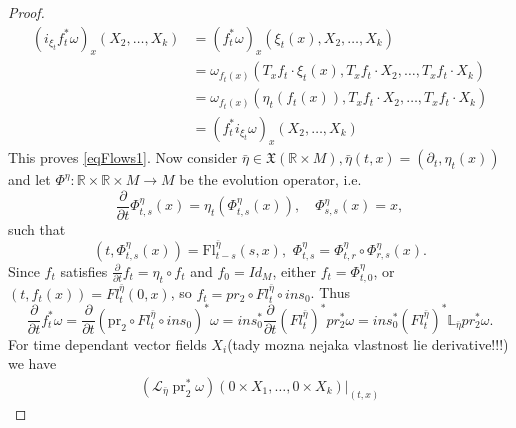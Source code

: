 \documentclass{article}
\theoremstyle{definition}
\begin{document}
\begin{proof}
    \begin{equation*}
        \begin{split}
           \left(i_{\xi_t} f_t^* \omega\right)_x\left(X_2, \ldots, X_k\right) &= \left(f_t^* \omega\right)_x\left(\xi_t(x), X_2, \ldots, X_k\right)\\
            &=\omega_{f_t(x)}\left(T_x f_t \cdot \xi_t(x), T_x f_t \cdot X_2, \ldots, T_x f_t \cdot X_k\right) \\
            &=\omega_{f_t(x)}\left(\eta_t\left(f_t(x)\right), T_x f_t \cdot X_2, \ldots, T_x f_t \cdot X_k\right) \\
            &= \left(f_t^* i_{\xi_t}  \omega\right)_x\left(X_2, \ldots, X_k\right)
        \end{split}
    \end{equation*}
    This proves \eqref{eqFlows1}. Now consider $\bar{\eta} \in \mathfrak{X}(\mathbb{R} \times M), \bar{\eta}(t, x)=\left(\partial_t, \eta_t(x)\right)$ and let $\Phi^\eta : \mathbb{R} \times \mathbb{R} \times M \rightarrow M$ be the evolution operator, i.e.
    \begin{equation*}
        \frac{\partial}{\partial t} \Phi_{t, s}^\eta(x)=\eta_t\left(\Phi_{t, s}^\eta(x)\right), \quad \Phi_{s, s}^\eta(x) = x,
    \end{equation*}
    such that 
    \begin{equation*}
        \left(t, \Phi_{t, s}^\eta(x)\right)=\mathrm{Fl}_{t-s}^{\bar{\eta}}(s, x), \hspace{4pt} \Phi_{t, s}^\eta=\Phi_{t, r}^\eta \circ \Phi_{r, s}^\eta(x).
    \end{equation*}
    Since $f_t$ satisfies 
    $\frac{\partial}{\partial t} f_t = \eta_t \circ f_t$ and $ f_0 = Id_M$, either $f_t = \Phi^\eta_{t,0}$, or $(t,f_t(x)) = Fl^{\bar{\eta}}_t(0,x)$, so $f_t = pr_2 \circ Fl^{\bar{\eta}}_t \circ ins_0$. Thus
    \begin{equation*}
        \frac{\partial}{\partial t} f_t^* \omega=\frac{\partial}{\partial t}\left(\mathrm{pr}_2 \circ Fl_t^{\bar{\eta}} \circ ins_0\right)^*\omega = ins_0^* \frac{\partial}{\partial t}(Fl_t^{\bar{\eta}})^*pr_2^*\omega = ins_0^*(Fl^{\bar{\eta}}_t)^*\mathbb{L}_{\bar{\eta}}pr_2^*\omega.
    \end{equation*}
    For time dependant vector fields $X_i$(tady mozna nejaka vlastnost lie derivative!!!) we have 
    \begin{equation*}
        \begin{split}
            \left(\mathcal{L}_{\bar{\eta}} \operatorname{pr}_2^* \omega\right) (0 \times X_1, \ldots,0 \times X_k)|_{(t,x)} 

\end{split}
\end{equation*}
\end{proof}
\end{document}
